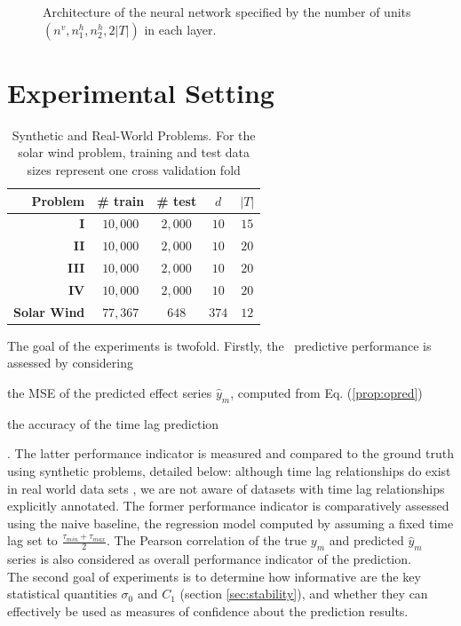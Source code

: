 \begin{figure}[ht]
\centerline{\resizebox*{0.7\textwidth}{!}{}}
\caption{\label{fig:archi} Architecture of the neural network specified by the number of units 
$(n^v,n_1^h,n_2^h,2\vert T\vert)$ in each layer.}
\label{fig:NN}
\end{figure}

\section{Experimental Setting}\label{sec:pdtExp}

\begin{table}[ht]
  \caption{
    Synthetic and Real-World Problems. 
    For the solar wind problem, training and test data sizes represent one cross validation fold}
  \label{tab:exp_data_info}
  \centering
  \begin{tabular}{ r c c c c}
  \hline
  Problem &  \# train & \# test & $d$ & $|T|$ \\
  \hline
  \textbf{I} & $10,000$ & $2,000$  & $10$ & $15$\\
  \textbf{II} & $10,000$ & $2,000$ & $10$ & $20$\\
  \textbf{III} & $10,000$ & $2,000$ & $10$ & $20$\\
  \textbf{IV} & $10,000$ & $2,000$ & $10$ & $20$\\
  \textbf{Solar Wind} & $77,367$ & $648$ & $374$ & $12$\\
  \hline
  \end{tabular}
\end{table}

The goal of the experiments is twofold. Firstly, the \XX\ predictive performance is assessed by 
considering 
%
\begin{enumerate*} 
  \item the MSE of the predicted effect series $\hat y_m$, computed from Eq. (\ref{prop:opred})  
  \item the accuracy of the time lag prediction 
\end{enumerate*}. 
%
The latter performance indicator is measured and compared to the ground truth using synthetic 
problems, detailed below: although time lag relationships do exist in real world data sets 
\citep{doi:10.1002/jgra.50429,ZHOU2006195}, we are not aware of datasets with time lag 
relationships explicitly annotated. The former performance indicator is comparatively assessed 
using the naive baseline, the regression model computed by assuming a fixed time lag set to 
$\frac{\tau_{min}+\tau_{max}}{2}$. The Pearson correlation of the true $y_m$ and predicted 
$\hat y_m$ series is also considered as overall performance indicator of the prediction.\\
The second goal of experiments is to determine how informative are the key statistical quantities 
$\sigma_0$ and $C_1$ (section \ref{sec:stability}), and whether they can effectively be used as 
measures of confidence about the prediction results. 

